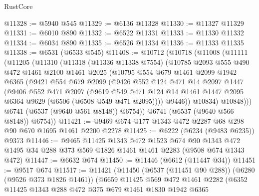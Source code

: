 \begin{lexlean}{RustCore}
\begin{coremodule}
@11328 := @5940 @545
@11329 := @6136 @11328
@11330 := @11327 @11329
@11331 := @6010 @890
@11332 := @6522 @11331
@11333 := @11330 @11332
@11334 := @6034 @890
@11335 := @6526 @11334
@11336 := @11333 @11335
@11338 := @6531 (@6533 @545)
@11408 := @10712
    (@10718
      (@11008
        (@11111
          (@11205
            (@11310
              (@11318
                (@11336 @11338 @7554)
                (@10785
                  @2093
                  @555
                  @490
                  @472
                  @1461
                  @2100
                  @1461
                  @2025
                  (@10795
                    @554
                    @679
                    @1461
                    @2099
                    @1942
                    @6365
                    (@9421
                      @554
                      @679
                      @2099
                      (@9426
                        @552
                        @124
                        @471
                        @14
                        @2097
                        @1447
                        (@9406
                          @552
                          @471
                          @2097
                          (@9619
                            @549
                            @471
                            @124
                            @14
                            @1461
                            @1447
                            @2095
                            @6364
                            @9629
                            (@6506 (@6508 @549 @471 @2095))))
                        @9446))
                    @10834)
                  @10848)))
            @6741
            (@6537 (@9640 @561 @8148))
            @6754))
        @6741
        (@6537 (@9640 @566 @8148))
        @6754))
@11421 := @9469 @674 @177 @1343 @472 @2287 @68 @298 @90 @670 @1695 @1461 @2200 @2278
@11425 := @6222 (@6234 (@9483 @6235)) @9373
@11446 := @9465
    @11425
    @1343
    @472
    @1523
    @674
    @90
    @1343
    @472
    @1495
    @34
    @288
    @373
    @569
    @1826
    @1461
    @1461
    @2283
    (@9508 @674 @1343 @472)
@11447 := @6632 @674
@11450 := @11446 (@6612 (@11447 @34))
@11451 := @9517 @674
@11517 := @11421
    (@11450
      (@6537 (@11451 @90 @288))
      (@6280 (@9526 @373 @1826 @1461))
      (@6659
        @11425
        @569
        @472
        @1461
        @2282
        (@6352
          @11425
          @1343
          @288
          @472
          @375
          @679
          @1461
          @1830
          @1942
          @6365

\end{coremodule}
\end{lexlean}
